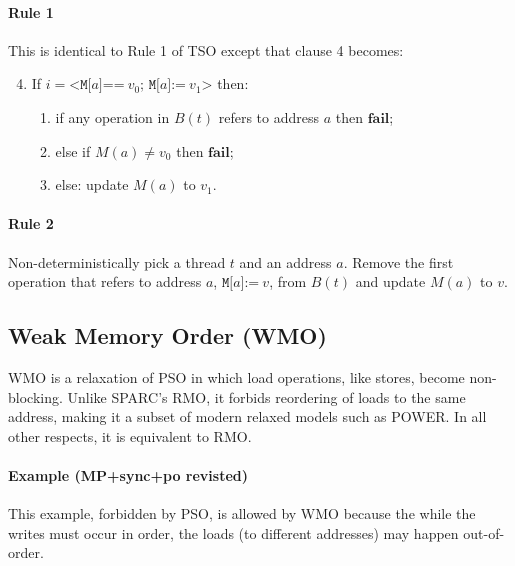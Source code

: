 \documentclass[11pt]{article}
\begin{document}
\paragraph{Rule 1}

This is identical to Rule 1 of TSO except that clause 4 becomes:

\begin{enumerate}
\setcounter{enumi}{3}
\item
     If $i = \texttt{<M[}a\texttt{]==}~v_0\texttt{; M[}a\texttt{]:=}~v_1
     \texttt{>}$ then:
\begin{enumerate}[i]

\item
           if any operation in $B(t)$ refers to address $a$ then
           $\textbf{fail}$;

\item
           else if $M(a) \neq v_0$ then $\textbf{fail}$;

\item
           else: update $M(a)$ to $v_1$.
\end{enumerate}
\end{enumerate}

\paragraph{Rule 2}

Non-deterministically pick a thread $t$ and an address $a$.  Remove
the first operation that refers to address $a$,
$\texttt{M[}a\texttt{]:=}~v$, from $B(t)$ and update $M(a)$ to $v$.

\subsection{Weak Memory Order (WMO)}

WMO is a relaxation of PSO in which load operations, like stores,
become non-blocking.  Unlike SPARC's RMO, it forbids reordering of
loads to the same address, making it a subset of modern relaxed models
such as POWER.  In all other respects, it is equivalent to RMO.

\paragraph{Example (MP+sync+po revisted)} This example, forbidden by
PSO, is allowed by WMO because the while the writes must occur in
order, the loads (to different addresses) may happen out-of-order.
\end{document}
